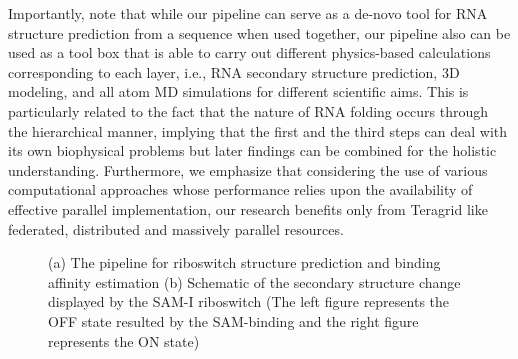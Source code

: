 \documentclass[a4paper,10pt]{article}
\newcommand{\up}{\vspace*{-1em}}
\begin{document}
Importantly, note that while our pipeline can serve as a de-novo tool for RNA structure prediction from a sequence when used together, our pipeline also can be used as a tool box that is able to carry out different physics-based calculations corresponding to each layer, i.e., RNA secondary structure prediction, 3D modeling, and all atom MD simulations for different scientific aims.  This is particularly related to the fact that the nature of RNA folding occurs through the hierarchical manner, implying that the first and the third steps can deal with its own biophysical problems but later findings can be combined for the holistic understanding.  Furthermore, we emphasize that considering the use of various computational approaches whose performance relies upon the availability of effective parallel implementation, our research benefits only from Teragrid like federated, distributed and massively parallel resources.

\begin{figure}
\begin{center}
\end{center}
\up\up
\caption{(a) The pipeline for riboswitch structure prediction and binding affinity estimation (b) Schematic of the secondary structure change displayed by the SAM-I riboswitch (The left figure represents the OFF state resulted by the SAM-binding and the right figure represents the ON state)}
\label{fig:ribo-pipeline}
\up
\end{figure}
\end{document}
